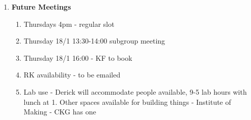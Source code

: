 \begin{enumerate}
\item  \textbf{Future Meetings}

\begin{enumerate}
\item Thursdays 4pm - regular slot

\item  Thursday 18/1 13:30-14:00 subgroup meeting

\item  Thursday 18/1 16:00 - KF to book

\item  RK availability - to be emailed

\item  Lab use - Derick will accommodate people available, 9-5 lab hours with lunch at 1. Other spaces available for building things - Institute of Making - CKG has one
\end{enumerate}
\end{enumerate}


